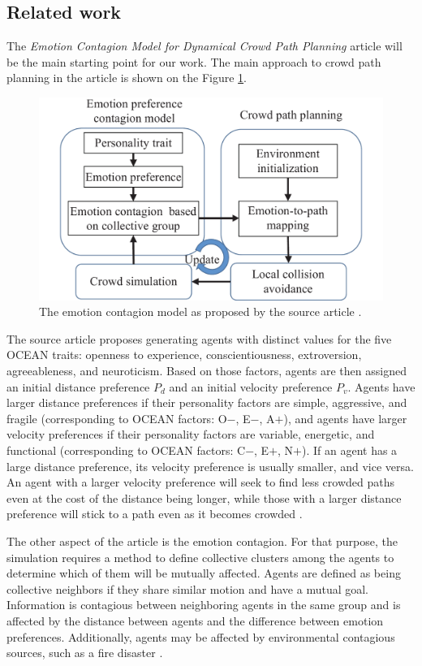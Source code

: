\documentclass[9pt]{pnas-new}
\begin{document}
\subsection{Related work}
The \textit{Emotion Contagion Model for Dynamical Crowd Path Planning} article will be the main starting point for our work. The main approach to crowd path planning in the article is shown on the Figure \ref{fig:outline}. 
\begin{figure}[h!]
    \centering
    \includegraphics[width=1\linewidth]{fig/outline.jpg}
    \caption{The emotion contagion model as proposed by the source article \cite{Wu_Huang_Tian_Yan_Yu_2024}.}
    \label{fig:outline}
\end{figure}

The source article proposes generating agents with distinct values for the five OCEAN traits: openness to experience, conscientiousness, extroversion, agreeableness, and neuroticism. Based on those factors, agents are then assigned an initial distance preference ${P_d}$ and an initial velocity preference ${P_v}$. Agents have larger distance preferences if their personality factors are simple, aggressive, and fragile (corresponding to OCEAN factors: O${-}$, E${-}$, A${+}$), and agents have larger velocity preferences if their personality factors are variable, energetic, and functional (corresponding to OCEAN factors: C${-}$, E${+}$, N${+}$). If an agent has a large distance preference, its velocity preference is usually smaller, and vice versa. An agent with a larger velocity preference will seek to find less crowded paths even at the cost of the distance being longer, while those with a larger distance preference will stick to a path even as it becomes crowded \cite{Wu_Huang_Tian_Yan_Yu_2024}.

The other aspect of the article is the emotion contagion. For that purpose, the simulation requires a method to define collective clusters among the agents to determine which of them will be mutually affected. Agents are defined as being collective neighbors if they share similar motion and have a mutual goal. Information is contagious between neighboring agents in the same group and is affected by the distance between agents and the difference between emotion preferences. Additionally, agents may be affected by environmental contagious sources, such as a fire disaster \cite{Wu_Huang_Tian_Yan_Yu_2024}.  
\end{document}
